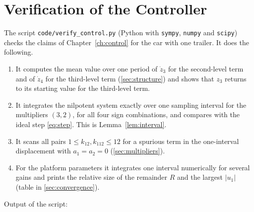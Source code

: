 
\chapter{Verification of the Controller}
\label{app:control}

The script \texttt{code/verify\_control.py} (Python with \texttt{sympy},
\texttt{numpy} and \texttt{scipy}) checks the claims of Chapter~\ref{ch:control}
for the car with one trailer. It does the following.

\begin{enumerate}
  \item It computes the mean value over one period of $\dot z_3$ for the
        second-level term and of $\dot z_4$ for the third-level term
        (\cref{sec:structure}) and shows that $z_3$ returns to its starting
        value for the third-level term.
  \item It integrates the nilpotent system exactly over one sampling interval
        for the multipliers $(3,2)$, for all four sign combinations, and compares
        with the ideal step \eqref{eq:step}. This is Lemma~\ref{lem:interval}.
  \item It scans all pairs $1\le k_{12},k_{112}\le12$ for a spurious term in
        the one-interval displacement with $a_1=a_2=0$
        (\cref{sec:multipliers}).
  \item For the platform parameters it integrates one interval numerically for
        several gains and prints the relative size of the remainder $R$ and the
        largest $|u_1|$ (table in \cref{sec:convergence}).
\end{enumerate}

Output of the script:

